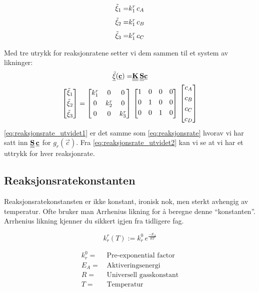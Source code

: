 \begin{align}
    \Tilde{\xi}_1 =& k^r_1\,c_A \\[0.3em]
    \Tilde{\xi}_2 =& k^r_1\,c_B \\[0.3em]
    \Tilde{\xi}_3 =& k^r_1\,c_C \\
\end{align}

Med tre utrykk for reaksjonratene setter vi dem sammen til et system av likninger:
\begin{align}
    \label{eq:reaksjonsrate_utvidet1}
    \underline{\Tilde{\xi}}(\underline{\textbf{c}}) =& \underline{\underline{\textbf{K}}}\,\underline{\underline{\textbf{S}}}\underline{\textbf{c}}
    \\
    \label{eq:reaksjonsrate_utvidet2}
    \begin{bmatrix}
    \Tilde{\xi}_1 \\[0.3em]
    \Tilde{\xi}_2 \\[0.3em]
    \Tilde{\xi}_3
    \end{bmatrix}   
    =
    \begin{bmatrix}
    k^r_1 & 0 & 0 \\[0.3em]
    0 & k^r_2 & 0\\[0.3em]
    0 & 0 & k^r_3
    \end{bmatrix}
    \,&
   \begin{bmatrix}
   1 & 0 & 0 & 0\\[0.3em]
   0 & 1 & 0 & 0\\[0.3em]
   0 & 0 & 1 & 0\\[0.3em]
   \end{bmatrix}
   \,
   \begin{bmatrix}
   c_A\\[0.3em]
   c_B\\[0.3em]
   c_C\\[0.3em]
   c_D
   \end{bmatrix}
\end{align}
\cref{eq:reaksjonsrate_utvidet1} er det samme som \cref{eq:reaksjonsrate} hvorav vi har satt inn $\underline{\underline{\textbf{S}}}\,\underline{\textbf{c}}$ for $g_r(\vec{c})$. Fra \cref{eq:reaksjonsrate_utvidet2} kan vi se at vi har et uttrykk for hver reaksjonrate. 



\subsection{Reaksjonsratekonstanten}
Reaksjonsratekonstansten er ikke konstant, ironisk nok, men sterkt avhengig av temperatur. Ofte bruker man Arrhenius likning for å beregne denne ``konstanten''. Arrhenius likning kjenner du sikkert igjen fra tidligere fag.

\begin{equation}
    \label{eq:arrhenius}
    k^r_r(T) :=k^0_r\,e^{\frac{-E_{A}}{RT}}
\end{equation}

\begin{align*}
    k^0_r =&\, \text{Pre-exponential factor} \\
    E_A =&\, \text{Aktiveringsenergi} \\
    R =&\, \text{Universell gasskonstant} \\
    T =&\, \text{Temperatur}
\end{align*}


